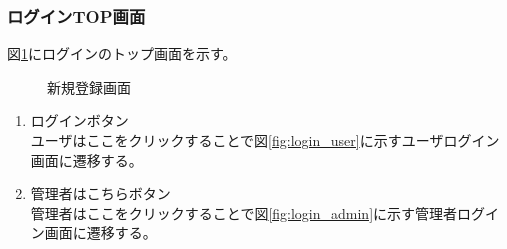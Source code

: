 \documentclass[a4j]{jarticle}
\begin{document}
\subsubsection{ログインTOP画面}
図\ref{fig:login_top}にログインのトップ画面を示す。
\begin{figure}[H]
\centering
{}
\caption{新規登録画面}
\label{fig:login_top}
\end{figure}
\begin{enumerate}
  \renewcommand{\labelenumi}{\textcircled{\scriptsize \theenumi}}

\item ログインボタン\\
ユーザはここをクリックすることで図\ref{fig:login_user}に示すユーザログイン画面に遷移する。
\item 管理者はこちらボタン\\
管理者はここをクリックすることで図\ref{fig:login_admin}に示す管理者ログイン画面に遷移する。
\end{enumerate}
\end{document}
